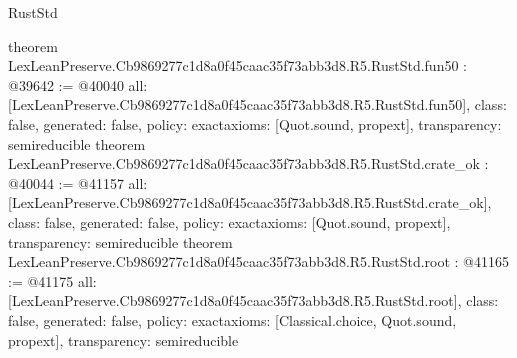 \begin{lexlean}{RustStd}
\begin{coremodule}
{}
theorem LexLeanPreserve.Cb9869277c1d8a0f45caac35f73abb3d8.R5.RustStd.fun50 : @39642 := @40040 {
  all: [LexLeanPreserve.Cb9869277c1d8a0f45caac35f73abb3d8.R5.RustStd.fun50],
  class: false,
  generated: false,
  policy: exact{axioms: [Quot.sound, propext]},
  transparency: semireducible
}
theorem LexLeanPreserve.Cb9869277c1d8a0f45caac35f73abb3d8.R5.RustStd.crate_ok : @40044 := @41157 {
  all: [LexLeanPreserve.Cb9869277c1d8a0f45caac35f73abb3d8.R5.RustStd.crate_ok],
  class: false,
  generated: false,
  policy: exact{axioms: [Quot.sound, propext]},
  transparency: semireducible
}
theorem LexLeanPreserve.Cb9869277c1d8a0f45caac35f73abb3d8.R5.RustStd.root : @41165 := @41175 {
  all: [LexLeanPreserve.Cb9869277c1d8a0f45caac35f73abb3d8.R5.RustStd.root],
  class: false,
  generated: false,
  policy: exact{axioms: [Classical.choice, Quot.sound, propext]},
  transparency: semireducible
}


\end{coremodule}
\end{lexlean}
